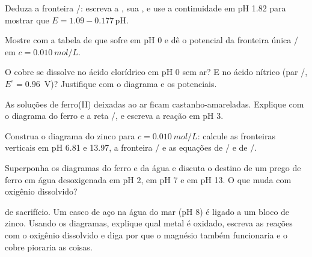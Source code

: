 \begin{exercise}[$\star\star$]\label{exo:b1:e-ph-diagrams:6}
Deduza a fronteira /: escreva a , sua
, e use a continuidade em pH 1.82 para mostrar que
$E = 1.09 -
0.177\,\mathrm{pH}$.
\end{exercise}

\begin{exercise}[$\star\star$]\label{exo:b1:e-ph-diagrams:7}
Mostre com a tabela de  que  sofre
 em pH 0 e dê o potencial da fronteira única
/ em $c = \qty{0.010}{mol/L}$.
\end{exercise}

\begin{exercise}[$\star\star$]\label{exo:b1:e-ph-diagrams:8}
O cobre se dissolve no ácido clorídrico em pH 0 sem ar? E no ácido
nítrico (par /, $E^\circ = 0.96$~V)? Justifique com o
diagrama e os potenciais.
\end{exercise}

\begin{exercise}[$\star\star$]\label{exo:b1:e-ph-diagrams:9}
As soluções de ferro(II) deixadas ao ar ficam castanho-amareladas.
Explique com o diagrama do ferro e a reta /, e escreva a
reação em pH 3.
\end{exercise}

\begin{exercise}[$\star\star\star$]\label{exo:b1:e-ph-diagrams:10}
Construa o diagrama do zinco para $c = \qty{0.010}{mol/L}$: calcule as
fronteiras verticais em pH 6.81 e 13.97, a fronteira /
e as equações de / e de /.
\end{exercise}

\begin{exercise}[$\star\star\star$]\label{exo:b1:e-ph-diagrams:11}
Superponha os diagramas do ferro e da água e discuta o destino de um
prego de ferro em água desoxigenada em pH 2, em pH 7 e em pH 13. O que
muda com oxigênio dissolvido?
\end{exercise}

\begin{exercise}[$\star\star\star$]\label{exo:b1:e-ph-diagrams:12}
 de sacrifício. Um casco de aço na água do mar (pH 8) é ligado a um
bloco de zinco. Usando os diagramas, explique qual metal é oxidado,
escreva as reações com o oxigênio dissolvido e diga por que o magnésio
também funcionaria e o cobre pioraria as coisas.
\end{exercise}


